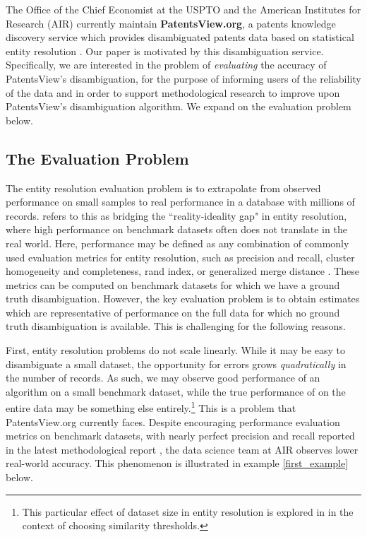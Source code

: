 \documentclass[fontsize=11pt]{article}
\theoremstyle{definition}
\begin{document}
The Office of the Chief Economist at the USPTO and the American Institutes for Research (AIR) currently maintain \textbf{PatentsView.org}, a patents knowledge discovery service which provides disambiguated patents data based on statistical entity resolution \citep{toole2021patentsview}. Our paper is motivated by this disambiguation service. Specifically, we are interested in the problem of \textit{evaluating} the accuracy of PatentsView's disambiguation, for the purpose of informing users of the reliability of the data and in order to support methodological research to improve upon PatentsView's disambiguation algorithm. We expand on the evaluation problem below.

\subsection{The Evaluation Problem}\label{sec:challenges}

The entity resolution evaluation problem is to extrapolate from observed performance on small samples to real performance in a database with millions of records. \cite{Wang2022} refers to this as bridging the ``reality-ideality gap" in entity resolution, where high performance on benchmark datasets often does not translate in the real world. Here, performance may be defined as any combination of commonly used evaluation metrics for entity resolution, such as precision and recall, cluster homogeneity and completeness, rand index, or generalized merge distance \citep{Maidasani2012}. These metrics can be computed on benchmark datasets for which we have a ground truth disambiguation. However, the key evaluation problem is to obtain estimates which are representative of performance on the full data for which no ground truth disambiguation is available. This is challenging for the following reasons.

First, entity resolution problems {do not scale linearly}. While it may be easy to disambiguate a small dataset, the opportunity for errors grows \textit{quadratically} in the number of records. As such, we may observe good performance of an algorithm on a small benchmark dataset, while the true performance of on the entire data may be something else entirely.\footnote{This particular effect of dataset size in entity resolution is explored in \cite{Draisbach2013} in the context of choosing similarity thresholds.} This is a problem that PatentsView.org currently faces. Despite encouraging performance evaluation metrics on benchmark datasets, with nearly perfect precision and recall reported in the latest methodological report \citep{Monath2021}, the data science team at AIR observes lower real-world accuracy. {This phenomenon is illustrated in example \ref{first_example} below.}
\end{document}
